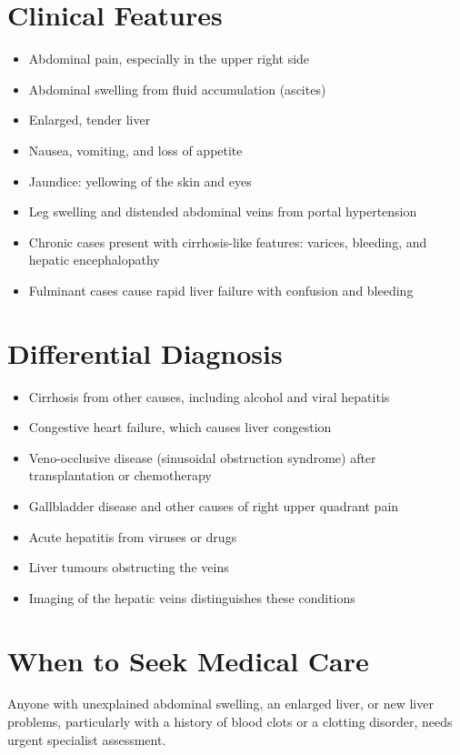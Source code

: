 \section*{Clinical Features}
\begin{itemize}
    \item Abdominal pain, especially in the upper right side
    \item Abdominal swelling from fluid accumulation (ascites)
    \item Enlarged, tender liver
    \item Nausea, vomiting, and loss of appetite
    \item Jaundice: yellowing of the skin and eyes
    \item Leg swelling and distended abdominal veins from portal hypertension
    \item Chronic cases present with cirrhosis-like features: varices, bleeding, and hepatic encephalopathy
    \item Fulminant cases cause rapid liver failure with confusion and bleeding
\end{itemize}

\section*{Differential Diagnosis}
\begin{itemize}
    \item Cirrhosis from other causes, including alcohol and viral hepatitis
    \item Congestive heart failure, which causes liver congestion
    \item Veno-occlusive disease (sinusoidal obstruction syndrome) after transplantation or chemotherapy
    \item Gallbladder disease and other causes of right upper quadrant pain
    \item Acute hepatitis from viruses or drugs
    \item Liver tumours obstructing the veins
    \item Imaging of the hepatic veins distinguishes these conditions
\end{itemize}

\section*{When to Seek Medical Care}
Anyone with unexplained abdominal swelling, an enlarged liver, or new liver problems, particularly with a history of blood clots or a clotting disorder, needs urgent specialist assessment.

